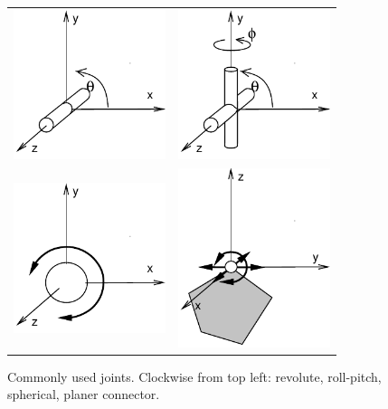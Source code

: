 \begin{figure}
\begin{center}
\begin{tabular}{cc}
\includegraphics[width=1.75in]{images/revoluteJoint}&
\includegraphics[width=1.75in]{images/rollPitchJoint}\\
\includegraphics[width=1.75in]{images/sphericalJoint}&
\includegraphics[width=1.75in]{images/planarConnector}\\
\end{tabular}
\end{center}
\caption{Commonly used joints. Clockwise from
top left: revolute, roll-pitch, spherical, planer connector.}
\label{CommonJoints:fig}
\end{figure}

